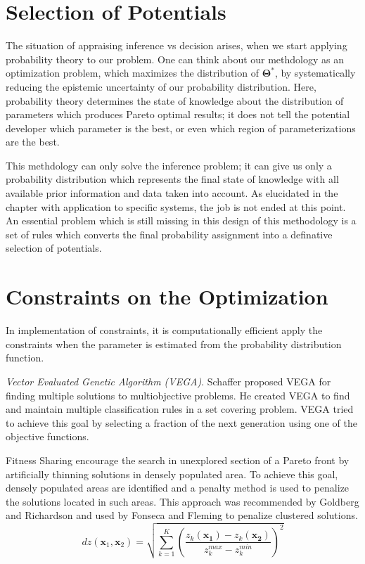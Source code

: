 \section{Selection of Potentials}

The situation of appraising inference vs decision arises, when we start applying probability theory to our problem.  One can think about our methdology as an optimization problem, which maximizes the distribution of $\bm{\Theta}^*$, by systematically reducing the epistemic uncertainty of our probability distribution.  Here, probability theory determines the state of knowledge about the distribution of parameters which produces Pareto optimal results; it does not tell the potential developer which parameter is the best, or even which region of parameterizations are the best.

This methdology can only solve the inference problem; it can give us only a probability distribution which represents the final state of knowledge with all available prior information and data taken into account.  As elucidated in the chapter with application to specific systems, the job is not ended at this point.  An essential problem which is still missing in this design of this methodology is a set of rules which converts the final probability assignment into a definative selection of potentials.



\section{Constraints on the Optimization}

In implementation of constraints, it is computationally efficient apply the constraints when the parameter is estimated from the probability distribution function.

\emph{Vector Evaluated Genetic Algorithm (VEGA)}.  Schaffer proposed VEGA for finding multiple solutions to multiobjective problems.  He created VEGA to find and maintain multiple classification rules in a set covering problem.  VEGA tried to achieve this goal by selecting a fraction of the next generation using one of the objective functions.

Fitness Sharing encourage the search in unexplored section of a Pareto front by artificially thinning solutions in densely populated area.  To achieve this goal, densely populated areas are identified and a penalty method is used to penalize the solutions located in such areas.  This approach was recommended by Goldberg and Richardson\cite{goldberg1987genetic} and used by Fonseca and Fleming\cite{fonseca1993multiobjective} to penalize clustered solutions.
\begin{equation}
    dz(\bm{x}_1,\bm{x}_2)
    = \sqrt{\sum_{k=1}^{K}  \left(\frac{z_k(\bm{x_1})-z_k(\bm{x_2})}
                                       {z_{k}^{max}-z_{k}^{min}}
                            \right)^{2}
      }
\end{equation}

